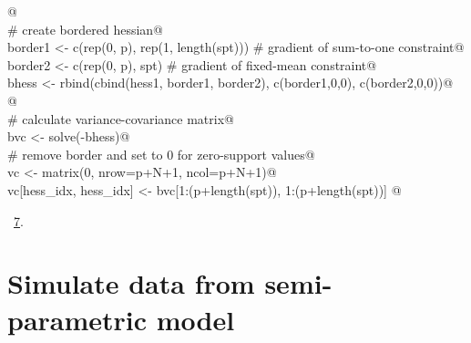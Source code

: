 \documentclass[reqno]{amsart}
\renewcommand{\NWlink}[2]{\hyperlink{#1}{#2}}
\begin{document}
\begin{flushleft}
\begin{list}{}{}
\mbox{}\verb@  @\\
\mbox{}\verb@  # create bordered hessian@\\
\mbox{}\verb@  border1 <- c(rep(0, p), rep(1, length(spt)))  # gradient of sum-to-one constraint@\\
\mbox{}\verb@  border2 <- c(rep(0, p), spt)          # gradient of fixed-mean constraint@\\
\mbox{}\verb@  bhess <- rbind(cbind(hess1, border1, border2), c(border1,0,0), c(border2,0,0))@\\
\mbox{}\verb@  @\\
\mbox{}\verb@  # calculate variance-covariance matrix@\\
\mbox{}\verb@  bvc <- solve(-bhess)@\\
\mbox{}\verb@  # remove border and set to 0 for zero-support values@\\
\mbox{}\verb@  vc <- matrix(0, nrow=p+N+1, ncol=p+N+1)@\\
\mbox{}\verb@  vc[hess_idx, hess_idx] <- bvc[1:(p+length(spt)), 1:(p+length(spt))]     @\\
\mbox{}\verb@@{\NWsep}
\end{list}
\vspace{-1.5ex}
\footnotesize
\begin{list}{}{\setlength{\itemsep}{-\parsep}\setlength{\itemindent}{-\leftmargin}}
\item \NWtxtMacroRefIn\ \NWlink{nuweb7}{7}.

\item{}
\end{list}
\vspace{4ex}
\end{flushleft}
\section{Simulate data from semi-parametric model}
\end{document}
